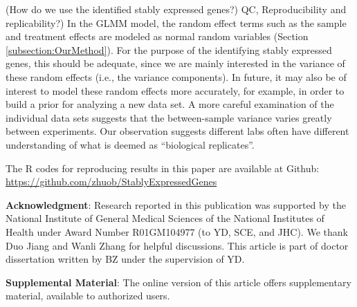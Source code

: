 				
				(How do we use the identified stably expressed genes?) QC, Reproducibility and
				replicability?)
				In the GLMM model, the random effect terms such as the sample and treatment
				effects are modeled as normal random variables (Section \ref{subsection:OurMethod}). For the purpose of the
				identifying stably expressed genes, this should be adequate, since we are
				mainly interested in the variance of these random effects (i.e., the variance
				components). In future, it may also be of interest to model these random
				effects more accurately, for example, in order to build a prior for analyzing
				a new data set.  A more careful examination of the individual data sets
				suggests that the between-sample variance varies greatly between experiments.
				Our observation suggests different labs often have different understanding of
				what is deemed as ``biological replicates''.
				
				
				The R codes for reproducing results in this paper are available at Github:
				\url{https://github.com/zhuob/StablyExpressedGenes}
				
				
				
				\textbf{Acknowledgment}: Research reported in this publication was supported by the National Institute of General Medical Sciences of the National Institutes of Health under Award Number R01GM104977 (to YD, SCE, and JHC). We thank Duo Jiang and Wanli Zhang for helpful discussions. This article is part of doctor dissertation written by BZ under the supervision of YD. 
				
				\textbf{Supplemental Material}: The online version of this article offers supplementary material,
				available to authorized users.
				
				\newpage
				
				
				
				
